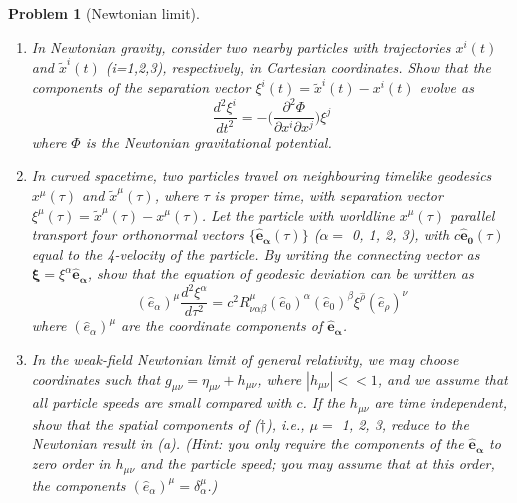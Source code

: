 \documentclass[a4paper]{article}
\theoremstyle{new2}
\theoremstyle{new}
\newtheorem{qns}{Problem}[section]
\begin{document}
\begin{qns}[Newtonian limit]\leavevmode
\begin{enumerate}[label=(\alph*)]
\item In Newtonian gravity, consider two nearby particles with trajectories $x^i(t)$ and $\tilde{x}^i(t)$ (i=1,2,3), respectively, in Cartesian coordinates. Show that the components of the separation vector $\xi^i(t)=\tilde{x}^i(t)-x^i(t)$ evolve as
$$\frac{d^2\xi^i}{dt^2}=-\bigg(\frac{\partial^2\Phi}{\partial x^i\partial x^j}\bigg)\xi^j$$
where $\Phi$ is the Newtonian gravitational potential.
\item In curved spacetime, two particles travel on neighbouring timelike geodesics $x^\mu(\tau)$ and $\tilde{x}^\mu(\tau)$, where $\tau$ is proper time, with separation vector $\xi^\mu(\tau)=\tilde{x}^\mu(\tau)-x^\mu(\tau)$. Let the particle with worldline $x^\mu(\tau)$ parallel transport four orthonormal vectors $\{\mathbf{\hat{e}_\alpha}(\tau)\}$ ($\alpha=$ 0, 1, 2, 3), with $c\mathbf{\hat{e}_0}(\tau)$ equal to the 4-velocity of the particle. By writing the connecting vector as $\boldsymbol{\xi}=\xi^\alpha\mathbf{\hat{e}_\alpha}$, show that the equation of geodesic deviation can be written as
\begin{equation}
(\hat{e}_\alpha)^\mu\frac{d^2\xi^\alpha}{d\tau^2}=c^2R_{\nu\alpha\beta}^\mu(\hat{e}_0)^\alpha(\hat{e}_0)^\beta\xi^{\hat{\rho}}(\hat{e}_\rho)^\nu\tag{\dag}
\end{equation}
where $(\hat{e}_\alpha)^\mu$ are the coordinate components of $\mathbf{\hat{e}_\alpha}$.
\item  In the weak-field Newtonian limit of general relativity, we may choose coordinates such that $g_{\mu\nu}=\eta_{\mu\nu}+h_{\mu\nu}$, where $|h_{\mu\nu}|<< 1$, and we assume that all particle speeds are small compared with $c$. If the $h_{\mu\nu}$ are time independent, show that the spatial components of ($\dag$), i.e., $\mu=$ 1, 2, 3, reduce to the Newtonian result in (a). (Hint: you only require the components of the $\mathbf{\hat{e}_\alpha}$ to zero order in $h_{\mu\nu}$ and the particle speed; you may assume that at this order, the components $(\hat{e}_\alpha)^\mu=\delta^\mu_\alpha$.)
\end{enumerate}
\end{qns}
\end{document}
